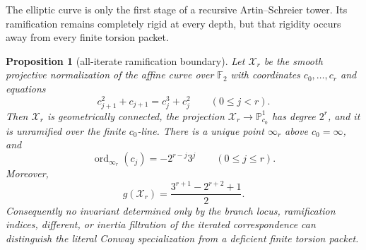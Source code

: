 \documentclass[11pt]{article}
\newtheorem{proposition}[theorem]{Proposition}
\theoremstyle{definition}
\theoremstyle{remark}
\begin{document}
The elliptic curve is only the first stage of a recursive
Artin--Schreier tower.  Its ramification remains completely rigid at every
depth, but that rigidity occurs away from every finite torsion packet.

\begin{proposition}[all-iterate ramification boundary]
\label{prop:z-iterate-ramification}
Let $\mathcal X_r$ be the smooth projective normalization of the affine
curve over $\mathbb F_2$ with coordinates $c_0,\ldots,c_r$ and equations
\[
 c_{j+1}^2+c_{j+1}=c_j^3+c_j^2
 \qquad(0\leq j<r).
\]
Then $\mathcal X_r$ is geometrically connected, the projection
$\mathcal X_r\to\mathbb P^1_{c_0}$ has degree $2^r$, and it is unramified
over the finite $c_0$-line.  There is a unique point $\infty_r$ above
$c_0=\infty$, and
\[
 \operatorname{ord}_{\infty_r}(c_j)
 =-2^{r-j}3^j\qquad(0\leq j\leq r).
\]
Moreover,
\[
 g(\mathcal X_r)=\frac{3^{r+1}-2^{r+2}+1}{2}.
\]
Consequently no invariant determined only by the branch locus, ramification
indices, different, or inertia filtration of the iterated correspondence can
distinguish the literal Conway specialization from a deficient finite
torsion packet.
\end{proposition}
\end{document}
